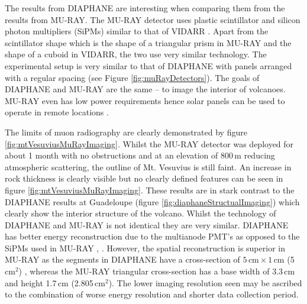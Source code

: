 The results from DIAPHANE are interesting when comparing them from the results from MU-RAY. The MU-RAY detector uses plastic scintillator and silicon photon multipliers (SiPMs) similar to that of VIDARR \cite{ANASTASIO2013423} \cite{Ambrosino_2014}. Apart from the scintillator shape which is the shape of a triangular prism in MU-RAY and the shape of a cuboid in VIDARR, the two use very similar technology. The experimental setup is very similar to that of DIAPHANE with panels arranged with a regular spacing (see Figure \ref{fig:muRayDetectors}). The goals of DIAPHANE and MU-RAY are the same -- to image the interior of volcanoes. MU-RAY even has low power requirements hence solar panels can be used to operate in remote locations \cite{ANASTASIO2013423}. 


The limits of muon radiography are clearly demonstrated by figure \ref{fig:mtVesuviusMuRayImaging}. Whilst the MU-RAY detector was deployed for about 1 month with no obstructions and at an elevation of 800\,m reducing atmospheric scattering, the outline of Mt. Vesuvius is still faint. An increase in rock thickness is clearly visible but no clearly defined features can be seen in figure \ref{fig:mtVesuviusMuRayImaging}. These results are in stark contrast to the DIAPHANE results at Guadeloupe (figure \ref{fig:diaphaneStructualImaging}) which clearly show the interior structure of the volcano. Whilst the technology of DIAPHANE and MU-RAY is not identical they are very similar. DIAPHANE has better energy reconstruction due to the multianode PMT’s as opposed to the SiPMs used in MU-RAY \cite{Marteau_2017}, \cite{ANASTASIO2013423}. However, the spatial reconstruction is superior in MU-RAY as the segments in DIAPHANE have a cross-section of $5\,\textrm{cm} \times 1\,\textrm{cm}$ (5\,cm$^2$) \cite{MARTEAU201223}, whereas the MU-RAY triangular cross-section has a base width of 3.3\,cm and height 1.7\,cm (2.805\,cm$^2$). The lower imaging resolution seen may be ascribed to the combination of worse energy resolution and shorter data collection period. %

